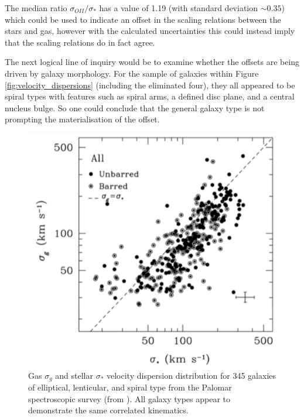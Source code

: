 \documentclass[12pt, twocolumn, nofootinbib]{revtex4-1}    %
\begin{document}
The median ratio $\sigma_{OII}/\sigma_*$ has a value of 1.19 (with standard deviation $\sim0.35$) which could be used to indicate an offset in the scaling relations between the stars and gas, however with the calculated uncertainties this could instead imply that the scaling relations do in fact agree. 

The next logical line of inquiry would be to examine whether the offsets are being driven by galaxy morphology. For the sample of galaxies within Figure \ref{fig:velocity_dispersions} (including the eliminated four), they all appeared to be spiral types with features such as spiral arms, a defined disc plane, and a central nucleus bulge. So one could conclude that the general galaxy type is not prompting the materialisation of the offset. 

\begin{figure}
\includegraphics[width=1.0\linewidth]{data/ho_2009.pdf}
\caption{Gas $\sigma_g$ and stellar $\sigma_*$ velocity dispersion distribution for 345 galaxies of elliptical, lenticular, and spiral type from the Palomar spectroscopic survey (from \cite{2009ApJ...699..638H}). All galaxy types appear to demonstrate the same correlated kinematics. }
\label{fig:ho_2009}
\end{figure} 
\end{document}
